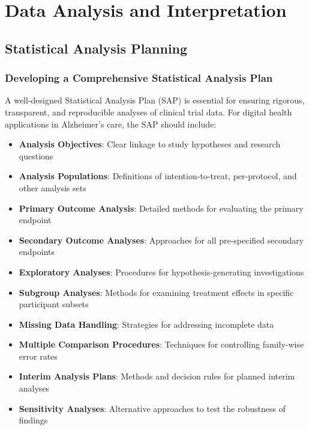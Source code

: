 \chapter{Data Analysis and Interpretation}

\section{Statistical Analysis Planning}
\subsection{Developing a Comprehensive Statistical Analysis Plan}
A well-designed Statistical Analysis Plan (SAP) is essential for ensuring rigorous, transparent, and reproducible analyses of clinical trial data. For digital health applications in Alzheimer's care, the SAP should include:

\begin{itemize}
    \item \textbf{Analysis Objectives}: Clear linkage to study hypotheses and research questions
    
    \item \textbf{Analysis Populations}: Definitions of intention-to-treat, per-protocol, and other analysis sets
    
    \item \textbf{Primary Outcome Analysis}: Detailed methods for evaluating the primary endpoint
    
    \item \textbf{Secondary Outcome Analyses}: Approaches for all pre-specified secondary endpoints
    
    \item \textbf{Exploratory Analyses}: Procedures for hypothesis-generating investigations
    
    \item \textbf{Subgroup Analyses}: Methods for examining treatment effects in specific participant subsets
    
    \item \textbf{Missing Data Handling}: Strategies for addressing incomplete data
    
    \item \textbf{Multiple Comparison Procedures}: Techniques for controlling family-wise error rates
    
    \item \textbf{Interim Analysis Plans}: Methods and decision rules for planned interim analyses
    
    \item \textbf{Sensitivity Analyses}: Alternative approaches to test the robustness of findings
\end{itemize}

